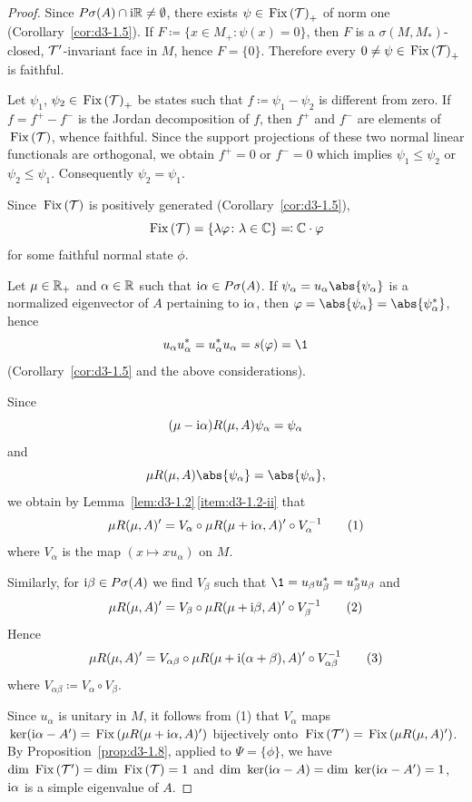 \begin{proof}
Since $P\sigma(A) \cap \mathrm{i}\mathbb{R} \neq \emptyset$, there exists $\psi \in \mathop{}\mathrm{Fix}\left(\mathcal{T}\right)_{+}$ of norm one (Corollary~\ref{cor:d3-1.5}).
If\/ $F \coloneq \{x \in M_{+} \colon \psi(x) = 0\}$, then $F$ is a $\sigma(M,M_{*})$-closed, $\mathcal{T}'$-invariant face in $M$, hence $F = \{0\}$.
Therefore every $0 \neq \psi \in \mathop{}\mathrm{Fix}\left(\mathcal{T}\right)_{+}$ is faithful.

Let $\psi_{1}$, $\psi_{2} \in \mathop{}\mathrm{Fix}\left(\mathcal{T}\right)_{+}$ be states such that $f \coloneq \psi_{1} - \psi_{2}$ is different from zero. 
If\/ $f = f^{+} - f^{-}$ is the Jordan decomposition of\/ $f$, then $f^{+}$ and $f^{-}$ are elements of\/ $\mathop{}\mathrm{Fix}\left(\mathcal{T}\right)$, whence faithful.
Since the support projections of these two normal linear functionals are orthogonal, we obtain $f^{+} = 0$ or $f^{-} = 0$ which implies $\psi_{1} \leq \psi_{2}$ or $\psi_{2} \leq \psi_{1}$.
Consequently $\psi_{2} = \psi_{1}$.

Since $\mathop{}\mathrm{Fix}\left(\mathcal{T}\right)$ is positively generated (Corollary~\ref{cor:d3-1.5}), 
\[
\Fix{\TT} = \{ \lambda \phi \colon \lambda \in \C \} \eqcolon \C \cdot \phi
\]
for some faithful normal state $\phi$.

Let $\mu \in \mathbb{R}_{+}$ and $\alpha \in \mathbb{R}$ such that $\mathrm{i}\alpha \in P\sigma(A)$.
If\/ $\psi_{\alpha} = u_{\alpha}\abs{\psi_{\alpha}}$ is a normalized eigenvector of\/ $A$ pertaining to $\mathrm{i}\alpha$, then $\phi = \abs{\psi_{\alpha}} = \abs{\psi_{\alpha}^{*}}$, hence 
%
\[
	u_{\alpha}u_{\alpha}^{*} = u_{\alpha}^{*}u_{\alpha} = s(\phi) = \1
\]
%
(Corollary~\ref{cor:d3-1.5} and the above considerations).

Since
\[
(\mu - \mathrm{i}\alpha)R(\mu,A)\psi_{\alpha} = \psi_{\alpha}
\]
and
\[
\mu R(\mu,A)\abs{\psi_{\alpha}} = \abs{\psi_{\alpha}} ,
\]
we obtain by Lemma~\ref{lem:d3-1.2}\,\ref{item:d3-1.2-ii} that
\[
\mu R(\mu,A)' = V_{\alpha} \circ \mu R(\mu+\mathrm{i}\alpha,A)' \circ V_{\alpha}^{-1} \tag{1}
\]
where $V_{\alpha}$ is the map $(x \mapsto xu_{\alpha})$ on $M$.

Similarly, for $\mathrm{i}\beta \in P\sigma(A)$ we find $V_{\beta}$ such that $\1 = u_{\beta}u_{\beta}^{*} = u_{\beta}^{*}u_{\beta}$ and
\[
\mu R(\mu,A)' = V_{\beta} \circ \mu R(\mu+ \mathrm{i} \beta,A)' \circ V_{\beta}^{-1} \tag{2} 
\]
Hence
\[
\mu R(\mu,A)' = V_{\alpha\beta} \circ \mu R(\mu+ \mathrm{i} (\alpha+\beta),A)' \circ V_{\alpha\beta}^{-1} \tag{3}
\]
where $V_{\alpha\beta} \coloneq V_{\alpha} \circ V_{\beta}$.

Since $u_{\alpha}$ is unitary in $M$, it follows from (1) that $V_{\alpha}$ maps $\mathop{}\mathrm{ker}(\mathrm{i}\alpha - A') = \mathop{}\mathrm{Fix}\left(\mu R(\mu+\mathrm{i}\alpha,A)'\right)$ bijectively onto $\mathop{}\mathrm{Fix}\left(\mathcal{T}'\right) = \mathop{}\mathrm{Fix}\left(\mu R(\mu,A)'\right)$.
By Proposition~\ref{prop:d3-1.8}, applied to $\Psi = \{\phi\}$, we have $\mathop{}\!\mathrm{dim}\, \mathop{}\mathrm{Fix}\left(\mathcal{T}'\right) = \mathop{}\!\mathrm{dim}\, \mathop{}\mathrm{Fix}\left(\mathcal{T}\right) = 1$ and $\mathop{}\!\mathrm{dim}\, \mathop{}\mathrm{ker}(\mathrm{i}\alpha - A) = \mathop{}\!\mathrm{dim}\, \mathop{}\mathrm{ker}(\mathrm{i}\alpha - A') = 1$, \ie $\mathrm{i}\alpha$ is a simple eigenvalue of\/ $A$.


\end{proof}
